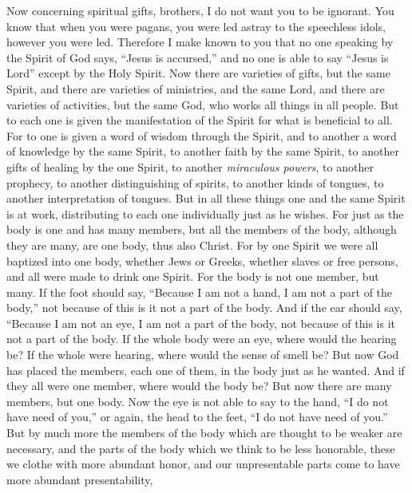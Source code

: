 \begin{biblechapter} %
 Now concerning spiritual gifts, brothers, I do not want you to be ignorant.
\verse You know that when you were pagans, you were led astray to the speechless idols, however you were led.
\verse Therefore I make known to you that no one speaking by the Spirit of God says, “Jesus is accursed,” and no one is able to say “Jesus is Lord” except by the Holy Spirit.
\verse Now there are varieties of gifts, but the same Spirit,
\verse and there are varieties of ministries, and the same Lord,
\verse and there are varieties of activities, but the same God, who works all things in all people.
\verse But to each one is given the manifestation of the Spirit for what is beneficial to all.
\verse For to one is given a word of wisdom through the Spirit, and to another a word of knowledge by the same Spirit,
\verse to another faith by the same Spirit, to another gifts of healing by the one Spirit,
\verse to another \textit{miraculous powers}, to another prophecy, to another distinguishing of spirits, to another kinds of tongues, to another interpretation of tongues.
\verse But in all these things one and the same Spirit is at work, distributing to each one individually just as he wishes.
 For just as the body is one and has many members, but all the members of the body, although they are many, are one body, thus also Christ.
\verse For by one Spirit we were all baptized into one body, whether Jews or Greeks, whether slaves or free persons, and all were made to drink one Spirit.
\verse For the body is not one member, but many.
\verse If the foot should say, “Because I am not a hand, I am not a part of the body,” not because of this is it not a part of the body.
\verse And if the ear should say, “Because I am not an eye, I am not a part of the body, not because of this is it not a part of the body.
\verse If the whole body were an eye, where would the hearing be? If the whole were hearing, where would the sense of smell be?
\verse But now God has placed the members, each one of them, in the body just as he wanted.
\verse And if they all were one member, where would the body be?
\verse But now there are many members, but one body.
\verse Now the eye is not able to say to the hand, “I do not have need of you,” or again, the head to the feet, “I do not have need of you.”
\verse But by much more the members of the body which are thought to be weaker are necessary,
\verse and the parts of the body which we think to be less honorable, these we clothe with more abundant honor, and our unpresentable parts come to have more abundant presentability,

\end{biblechapter}
